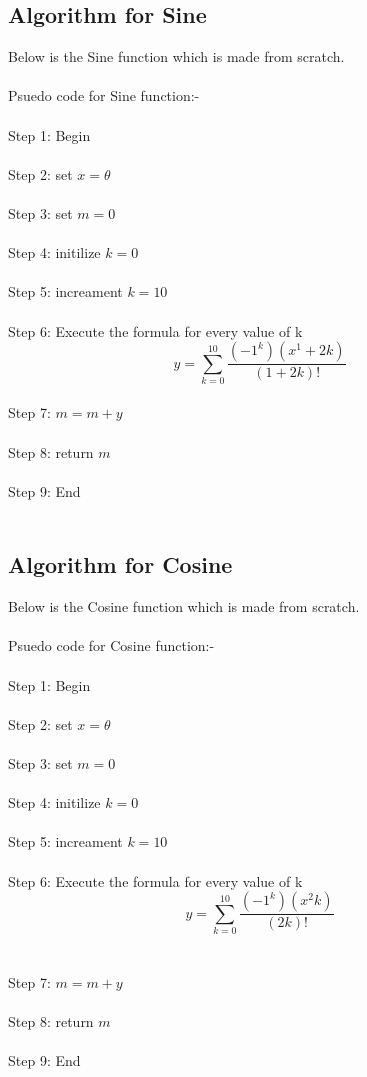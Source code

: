 \documentclass[11pt]{article}
\begin{document}
	\subsection{Algorithm for Sine}
		Below is the Sine function which is made from scratch.\\\\
		Psuedo code for Sine function:-\\\\
		Step 1: Begin\\\\
		Step 2: set $x=\theta$\\\\ 
		Step 3: set $m=0$\\\\
		Step 4: initilize $k=0$\\\\
		Step 5: increament $k=10$\\\\
		Step 6: Execute the formula for every value of k $$y= \sum_{k=0}^{10}  \frac{(-1^k)(x^1+2k)}{(1+2k)!}$$\\ %
		Step 7: $m=m+y$\\\\
		Step 8: return $m$\\\\
		Step 9: End\\\\
		
	\subsection{Algorithm for Cosine}
		Below is the Cosine function which is made from scratch.\\\\
		Psuedo code for Cosine function:-\\\\
		Step 1: Begin\\\\
		Step 2: set $x=\theta$\\\\ 
		Step 3: set $m=0$\\\\
		Step 4: initilize $k=0$\\\\
		Step 5: increament $k=10$\\\\
		Step 6: Execute the formula for every value of k $$y= \sum_{k=0}^{10}  \frac{(-1^k)(x^2k)}{(2k)!}$$\\\\ %
		Step 7: $m=m+y$\\\\
		Step 8: return $m$\\\\
		Step 9: End\\\\
		 
\end{document}
